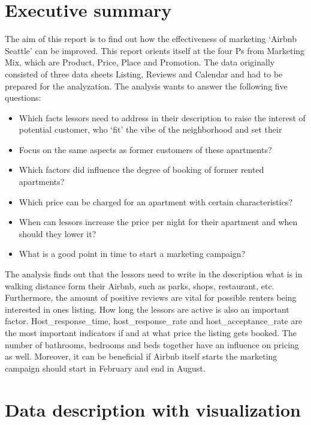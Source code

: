 \section{Executive summary} 
\noindent 
The aim of this report is to find out how the effectiveness of marketing ‘Airbnb Seattle’ can be improved. This report orients itself at the four Ps from Marketing Mix, which are Product, Price, Place and Promotion. 
The data originally consisted of three data sheets Listing, Reviews and Calendar and had to be prepared for the analyzation. 
The analysis wants to answer the following five questions: 

\begin{itemize}
\item Which facts lessors need to address in their description to raise the interest of potential customer, who ‘fit’ the vibe of the neighborhood and set their
\item Focus on the same aspects as former customers of these apartments?
\item Which factors did influence the degree of booking of former rented apartments? 
\item Which price can be charged for an apartment with certain characteristics?
\item When can lessors increase the price per night for their apartment and when should they lower it?
\item What is a good point in time to start a marketing campaign?
\end{itemize}
The analysis finds out that the lessors need to write in the description what is in walking distance form their Airbnb, such as parks, shops, restaurant, etc.
Furthermore, the amount of positive reviews are vital for possible renters being interested in ones listing. How long the lessors are active is also an important factor. 
Host\_response\_time, host\_response\_rate and host\_acceptance\_rate are the most important indicators if and at what price the listing gets booked. The number of bathrooms, bedrooms and beds together have an influence on pricing as well. 
Moreover, it can be beneficial if Airbnb itself starts the marketing campaign should start in February and end in August. 


\section{Data description with visualization}
